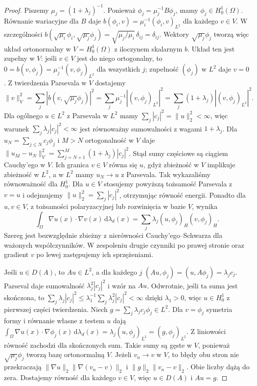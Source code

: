 \begin{proof}
Piszemy $\mu_j=(1+\lambda_j)^{-1}$.
Ponieważ $\phi_j=\mu_j^{-1}B\phi_j$, mamy
$\phi_j\in H_0^1(\Omega)$. Równanie wariacyjne dla $B$
daje $b(\phi_i,v)=\mu_i^{-1}(\phi_i,v)_{L^2}$
dla każdego $v\in V$. W szczególności
$b(\sqrt{\mu_i}\phi_i,\sqrt{\mu_j}\phi_j)
=\sqrt{\mu_j/\mu_i}\,\delta_{ij}=\delta_{ij}$.
Wektory $\sqrt{\mu_j}\phi_j$ tworzą więc układ
ortonormalny w $V=H_0^1(\Omega)$ z iloczynem skalarnym $b$. Układ ten jest zupełny w $V$:
jeśli $v\in V$ jest do niego ortogonalny, to
$0=b(v,\phi_j)=\mu_j^{-1}(v,\phi_j)_{L^2}$
dla wszystkich $j$; zupełność $(\phi_j)$ w $L^2$ daje $v=0$.
Z twierdzenia Parsevala w $V$ dostajemy
\[
\|v\|_V^2=\sum_j|b(v,\sqrt{\mu_j}\phi_j)|^2
=\sum_j\mu_j^{-1}|(v,\phi_j)_{L^2}|^2
=\sum_j(1+\lambda_j)|(v,\phi_j)_{L^2}|^2.
\]
Dla ogólnego $u\in L^2$ z Parsevala w $L^2$ mamy
$\sum_j|c_j|^2=\|u\|_2^2<\infty$, więc warunek
$\sum_j\lambda_j|c_j|^2<\infty$ jest równoważny
sumowalności z wagami $1+\lambda_j$.
Dla $u_N=\sum_{j\le N}c_j\phi_j$ i $M>N$ ortogonalność
w $V$ daje
$\|u_M-u_N\|_V^2=\sum_{j=N+1}^M(1+\lambda_j)|c_j|^2$.
Stąd sumy częściowe są ciągiem Cauchy'ego w $V$. Ich granica $v\in V$
równa się $u$, gdyż zbieżność w $V$ implikuje zbieżność
w $L^2$, a w $L^2$ mamy $u_N\to u$ z Parsevala.
Tak wykazaliśmy równoważność dla $H_0^1$.
Dla $u\in V$ stosujemy powyższą tożsamość Parsevala
z $v=u$ i odejmujemy $\|u\|_2^2=\sum_j|c_j|^2$,
otrzymując równość energii.
Ponadto dla $u,v\in V$, z tożsamości polaryzacyjnej
lub rozwinięcia w bazie $V$, wynika
\[
 \int_\Omega\nabla u(x)\cdot\nabla v(x)\,\mathrm d\lambda_d(x)
 =\sum_j\lambda_j(u,\phi_j)_H(v,\phi_j)_H .
\]
Szereg jest bezwzględnie zbieżny z nierówności
Cauchy'ego--Schwarza dla ważonych współczynników.
W zespoleniu drugie czynniki po prawej stronie oraz
gradient $v$ po lewej zastępujemy ich sprzężeniami.

Jeśli $u\in D(A)$, to $Au\in L^2$, a dla każdego $j$
$(Au,\phi_j)=(u,A\phi_j)=\lambda_jc_j$.
Parseval daje sumowalność $\lambda_j^2|c_j|^2$ i wzór
na $Au$. Odwrotnie, jeśli ta suma jest skończona,
to $\sum_j\lambda_j|c_j|^2
\le\lambda_1^{-1}\sum_j\lambda_j^2|c_j|^2<\infty$
dzięki $\lambda_1>0$, więc $u\in H_0^1$ z pierwszej
części twierdzenia. Niech $g=\sum_j\lambda_jc_j\phi_j\in L^2$.
Dla $v=\phi_j$ symetria formy i równanie własne
z testem $u$ dają
$\int_\Omega\nabla u(x)\cdot\nabla\phi_j(x)\,\mathrm d\lambda_d(x)
=\lambda_j(u,\phi_j)_{L^2}=(g,\phi_j)_{L^2}$.
Z liniowości równość zachodzi dla skończonych sum.
Takie sumy są gęste w $V$, ponieważ
$\sqrt{\mu_j}\phi_j$ tworzą bazę ortonormalną $V$.
Jeżeli $v_n\to v$ w $V$, to błędy obu stron nie przekraczają
$\|\nabla u\|_2\|\nabla(v_n-v)\|_2$ i
$\|g\|_2\|v_n-v\|_2$. Obie liczby dążą do zera.
Dostajemy równość dla każdego $v\in V$, więc
$u\in D(A)$ i $Au=g$.
\end{proof}


